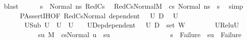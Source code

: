 \begin{isabellebody}
\ blast\isanewline
\ \ \ \ \isamarkupfalse%
\ {\isacartoucheopen}s{\isacharprime}{\kern0pt}{\isacharprime}{\kern0pt}\ {\isacharequal}{\kern0pt}\ Normal\ ns{\isacartoucheclose}\ RedCs{}\ \isamarkupfalse%
\ RedCs{}Normal{\isacharcolon}{\kern0pt}{\isachardoublequoteopen}M{\isacharcomma}{\kern0pt}{\isasymLambda}{\isacharcomma}{\kern0pt}{\isasymGamma}{\isacharcomma}{\kern0pt}{\isasymOmega}\ {\isasymturnstile}\ {\isasymlangle}cs{}{\isacharcomma}{\kern0pt}\ Normal\ ns{\isasymrangle}\ {\isacharbrackleft}{\kern0pt}{\isasymrightarrow}{\isacharbrackright}{\kern0pt}\ s{\isacharprime}{\kern0pt}{\isachardoublequoteclose}\ \isamarkupfalse%
\ simp\isanewline
\ \ \ \ \isamarkupfalse%
\ PAssert{\isachardot}{\kern0pt}IH{\isacharbrackleft}{\kern0pt}OF\ RedCs{}Normal\ {\isacartoucheopen}dependent\ {\isasymLambda}{\isacharprime}{\kern0pt}\ {\isasymOmega}\ U{}\ D{}{\isacartoucheclose}{\isacharbrackright}{\kern0pt}\ \isamarkupfalse%
\ U{}\ \isanewline
\ \ \ \ \ \ \ U{}Sub{\isacharcolon}{\kern0pt}\ {\isachardoublequoteopen}U{}\ {\isasymsubseteq}\ U{}{\isachardoublequoteclose}\ \ {\isachardoublequoteopen}U{}\ {\isasymnoteq}\ {\isacharbraceleft}{\kern0pt}{\isacharbraceright}{\kern0pt}{\isachardoublequoteclose}\ \ U{}Dep{\isacharcolon}{\kern0pt}{\isachardoublequoteopen}dependent\ {\isasymLambda}{\isacharprime}{\kern0pt}\ {\isasymOmega}\ U{}\ {\isacharparenleft}{\kern0pt}D{}\ {\isasymunion}\ set\ W{\isacharparenright}{\kern0pt}{\isachardoublequoteclose}\ \isanewline
\ \ \ \ \ \ \ U{}Rel{\isacharcolon}{\kern0pt}{\isachardoublequoteopen}{\isacharparenleft}{\kern0pt}{\isasymforall}u{\isasymin}U{}{\isachardot}{\kern0pt}\isanewline
\ \ \ \ \ \ \ \ \ \ \ {\isasymexists}su{\isachardot}{\kern0pt}\ {\isacharparenleft}{\kern0pt}M{\isacharcomma}{\kern0pt}{\isasymLambda}{\isacharprime}{\kern0pt}{\isacharcomma}{\kern0pt}{\isasymGamma}{\isacharcomma}{\kern0pt}{\isasymOmega}\ {\isasymturnstile}\ {\isasymlangle}cs{}{\isacharcomma}{\kern0pt}Normal\ u{\isasymrangle}\ {\isacharbrackleft}{\kern0pt}{\isasymrightarrow}{\isacharbrackright}{\kern0pt}\ su{\isacharparenright}{\kern0pt}\ {\isasymand}\isanewline
\ \ \ \ \ \ \ \ \ \ \ \ \ \ \ \ {\isacharparenleft}{\kern0pt}s{\isacharprime}{\kern0pt}\ {\isacharequal}{\kern0pt}\ Failure\ {\isasymlongrightarrow}\ su\ {\isacharequal}{\kern0pt}\ Failure{\isacharparenright}{\kern0pt}\ {\isasymand}\isanewline

\end{isabellebody}
